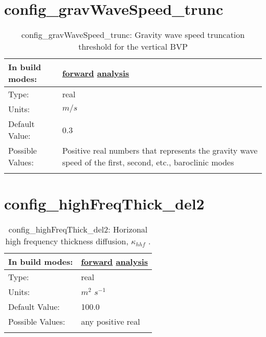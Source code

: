 \section[config\_gravWaveSpeed\_trunc]{config\_gravWaveSpeed\_trunc}
\label{sec:nm_sec_config_gravWaveSpeed_trunc}
\begin{center}
\begin{longtable}{| p{2.0in} || p{4.0in} |}
    \hline
    In build modes: & \hyperref[subsec:forward_nm_tab_mesoscale_eddy_parameterization]{forward} \hyperref[subsec:analysis_nm_tab_mesoscale_eddy_parameterization]{analysis} \\
    \hline
    Type: & real \\
    \hline
    Units: & $m/s$ \\
    \hline
    Default Value: & 0.3 \\
    \hline
    Possible Values: & Positive real numbers that represents the gravity wave speed of the first, second, etc., baroclinic modes \\
    \hline
    \caption{config\_gravWaveSpeed\_trunc: Gravity wave speed truncation threshold for the vertical BVP}
\end{longtable}
\end{center}
\section[config\_highFreqThick\_del2]{config\_highFreqThick\_del2}
\label{sec:nm_sec_config_highFreqThick_del2}
\begin{center}
\begin{longtable}{| p{2.0in} || p{4.0in} |}
    \hline
    In build modes: & \hyperref[subsec:forward_nm_tab_ALE_frequency_filtered_thickness]{forward} \hyperref[subsec:analysis_nm_tab_ALE_frequency_filtered_thickness]{analysis} \\
    \hline
    Type: & real \\
    \hline
    Units: & $m^2$ $s^{-1}$ \\
    \hline
    Default Value: & 100.0 \\
    \hline
    Possible Values: & any positive real \\
    \hline
    \caption{config\_highFreqThick\_del2:  Horizonal high frequency thickness diffusion,  $\kappa_{hhf}$ .}
\end{longtable}
\end{center}
